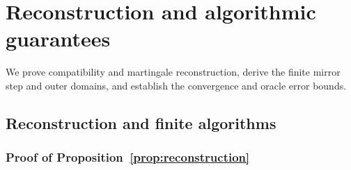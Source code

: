 \documentclass[11pt]{article}
\theoremstyle{plain}
\theoremstyle{definition}
\theoremstyle{remark}
\begin{document}
\section{Reconstruction and algorithmic guarantees}
\label{app:algorithm-proofs}

We prove compatibility and martingale reconstruction, derive the finite mirror step
and outer domains, and establish the convergence and oracle error bounds.

\subsection{Reconstruction and finite algorithms}

\subsubsection{Proof of Proposition~\ref{prop:reconstruction}}\label{proof:10.1}
\end{document}
